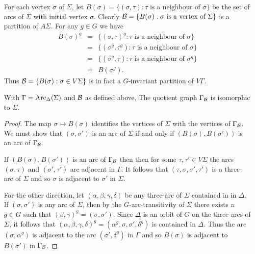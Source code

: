 For each vertex $\sigma$ of $\Sigma$, let 
$B(\sigma) = \{ (\sigma, \tau) : \tau \mbox{ is a neighbour of } \sigma \}$
be the set of arcs of $\Sigma$ with initial vertex $\sigma$.
Clearly $\mathcal{B} = \{ B(\sigma) : \sigma \mbox{ is a vertex of } \Sigma \}$ 
is a partition of $A \Sigma$.  
For any $g \in G$ we have 
\begin{eqnarray*}
B(\sigma)^g & = & \{ (\sigma, \tau)^g : \tau \mbox{ is a neighbour of } \sigma \} \\
              & = & \{ (\sigma^g, \tau^g) : \tau \mbox{ is a neighbour of } \sigma \} \\
	      & = & \{ (\sigma^g, \tau) : \tau \mbox{ is a neighbour of } \sigma^g \} \\
	      & = & B(\sigma^g).
\end{eqnarray*}
Thus $\mathcal{B} = \{ B(\sigma) : \sigma \in V \Sigma \}$ 
is in fact a $G$-invariant partition of $V \Gamma$. 

\begin{proposition}
\label{three-arc quotient}
With $\Gamma = \operatorname{Arc}_{\Delta}(\Sigma)$ and $\mathcal{B}$ as defined above,
The quotient graph $\Gamma_{\mathcal{B}}$ is isomorphic to $\Sigma$.

\begin{proof}
The map $\sigma \mapsto B(\sigma)$ identifies the vertices 
of $\Sigma$ with the vertices of $\Gamma_{\mathcal{B}}$.
We must show that 
$(\sigma, \sigma')$ is an arc of $\Sigma$ if and only if
$(B(\sigma), B(\sigma'))$ is an arc of $\Gamma_{\mathcal{B}}$.

If $(B(\sigma), B(\sigma'))$ is an arc of $\Gamma_{\mathcal{B}}$
then then for some $\tau, \tau' \in V \Sigma$ 
the arcs $(\sigma, \tau)$ and $(\sigma',\tau')$ are adjacent in $\Gamma$.
It follows that 
$(\tau, \sigma, \sigma',\tau')$ is a three-arc of $\Sigma$
and so $\sigma$ is adjacent to $\sigma'$ in $\Sigma$. 

For the other direction, 
let $(\alpha, \beta, \gamma, \delta)$ be any three-arc 
of $\Sigma$ contained in in $\Delta$.
If $(\sigma, \sigma')$ is any arc of $\Sigma$, 
then by the $G$-arc-transitivity of $\Sigma$
there exists a $g \in G$ such that $(\beta,\gamma)^g = (\sigma,\sigma')$.
Since $\Delta$ is an orbit of $G$ on the three-arcs of $\Sigma$, 
it follows that 
$(\alpha,\beta,\gamma,\delta)^g = (\alpha^g, \sigma, \sigma', \delta^g)$ 
is contained in $\Delta$.
Thus the arc $(\sigma, \alpha^g)$ is adjacent to 
the arc $(\sigma', \delta^g)$ in $\Gamma$
and so $B(\sigma)$ is adjacent to $B(\sigma')$ in $\Gamma_{\mathcal{B}}$.


\end{proof}
\end{proposition}

